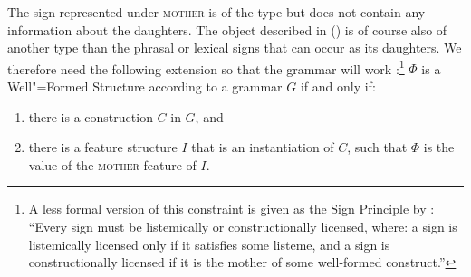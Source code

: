 The sign represented under \textsc{mother} is of the type  but does not contain any
information about the daughters.
The object described in () is of course also of another type than the phrasal or lexical signs that can occur as its daughters.
We therefore need the following extension so that the grammar will work \citep*[]{SWB2003a}:\footnote{
A less formal version of this constraint is given as the Sign Principle by
\citet[]{Sag2012a}: ``Every sign must be listemically or constructionally licensed, where: a
sign is listemically licensed only if it satisfies some listeme, and a sign is constructionally
licensed if it is the mother of some well-formed construct.''
}
\ea
\label{meta-construction-statemnet}
$\Phi$ is a Well"=Formed Structure according to a grammar $G$ if and only if:
\begin{enumerate}
\item there is a construction $C$ in $G$, and
\item there is a feature structure $I$ that is an instantiation of $C$, such that
      $\Phi$ is the value of the \textsc{mother} feature of $I$.
\end{enumerate}
\z

